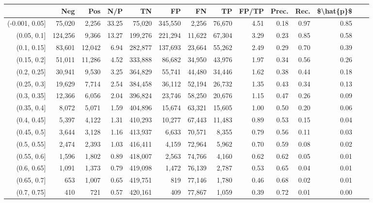 \begin{tabular}{rrrrrrrrrrrrrr}
\toprule
{} &      Neg &     Pos &    N/P &       TN &       FP &      FN &      TP & FP/TP & Prec. &  Rec. & \$\textbackslash hat\{p\}\$ \\
\midrule
(-0.001, 0.05] &   75,020 &   2,256 &  33.25 &   75,020 &  345,550 &   2,256 &  76,670 &  4.51 &  0.18 &  0.97 &      0.85 \\
(0.05, 0.1]    &  124,256 &   9,366 &  13.27 &  199,276 &  221,294 &  11,622 &  67,304 &  3.29 &  0.23 &  0.85 &      0.58 \\
(0.1, 0.15]    &   83,601 &  12,042 &   6.94 &  282,877 &  137,693 &  23,664 &  55,262 &  2.49 &  0.29 &  0.70 &      0.39 \\
(0.15, 0.2]    &   51,011 &  11,286 &   4.52 &  333,888 &   86,682 &  34,950 &  43,976 &  1.97 &  0.34 &  0.56 &      0.26 \\
(0.2, 0.25]    &   30,941 &   9,530 &   3.25 &  364,829 &   55,741 &  44,480 &  34,446 &  1.62 &  0.38 &  0.44 &      0.18 \\
(0.25, 0.3]    &   19,629 &   7,714 &   2.54 &  384,458 &   36,112 &  52,194 &  26,732 &  1.35 &  0.43 &  0.34 &      0.13 \\
(0.3, 0.35]    &   12,366 &   6,056 &   2.04 &  396,824 &   23,746 &  58,250 &  20,676 &  1.15 &  0.47 &  0.26 &      0.09 \\
(0.35, 0.4]    &    8,072 &   5,071 &   1.59 &  404,896 &   15,674 &  63,321 &  15,605 &  1.00 &  0.50 &  0.20 &      0.06 \\
(0.4, 0.45]    &    5,397 &   4,122 &   1.31 &  410,293 &   10,277 &  67,443 &  11,483 &  0.89 &  0.53 &  0.15 &      0.04 \\
(0.45, 0.5]    &    3,644 &   3,128 &   1.16 &  413,937 &    6,633 &  70,571 &   8,355 &  0.79 &  0.56 &  0.11 &      0.03 \\
(0.5, 0.55]    &    2,474 &   2,393 &   1.03 &  416,411 &    4,159 &  72,964 &   5,962 &  0.70 &  0.59 &  0.08 &      0.02 \\
(0.55, 0.6]    &    1,596 &   1,802 &   0.89 &  418,007 &    2,563 &  74,766 &   4,160 &  0.62 &  0.62 &  0.05 &      0.01 \\
(0.6, 0.65]    &    1,091 &   1,373 &   0.79 &  419,098 &    1,472 &  76,139 &   2,787 &  0.53 &  0.65 &  0.04 &      0.01 \\
(0.65, 0.7]    &      653 &   1,007 &   0.65 &  419,751 &      819 &  77,146 &   1,780 &  0.46 &  0.68 &  0.02 &      0.01 \\
(0.7, 0.75]    &      410 &     721 &   0.57 &  420,161 &      409 &  77,867 &   1,059 &  0.39 &  0.72 &  0.01 &      0.00 \\

\end{tabular}
